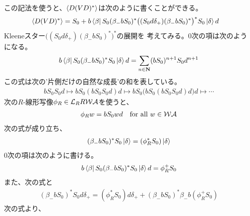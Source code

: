{	この記法を使うと、$\mathinner{\langle{D(VD)^*}\rangle}$は次のように書くことができる。
	\begin{equation*}\begin{split}
		\mathinner{\langle{D(VD)^*}\rangle} &= S_0 + b\mathinner{\langle{\beta}|}S_0(\beta_-bS_0)^*
		\bigl((S_0d\delta_+)(\beta_-bS_0)^*\bigr)^*S_0\mathinner{|{\delta}\rangle}d
	\end{split}\end{equation*}
	Kleeneスター$\bigl((S_0d\delta_+)(\beta_-bS_0)^*\bigr)^*$の展開を
	考えてみる。$0$次の項は次のようになる。
	\begin{equation*}\begin{split}
		b\mathinner{\langle{\beta}|}S_0(\beta_-bS_0)^*S_0\mathinner{|{\delta}\rangle}d
		= \sum_{n\in\mathbf{N}}(bS_0)^{n+1}S_0d^{n+1}
	\end{split}\end{equation*}
	この式は次の'片側だけの自然な成長'の和を表している。
	\begin{equation*}\begin{split}
		bS_0S_0d \mapsto bS_0(bS_0S_0d)d
		\mapsto bS_0\bigl(bS_0(bS_0S_0d)d\bigr)d
		\mapsto \cdots
	\end{split}\end{equation*}
	次の$R$-線形写像$\phi_R\in\mathcal{L}_RR{{\mathcal{W}}}{{\mathcal{A}}}$を使うと、
	\begin{equation*}\begin{split}
		\phi_Rw &= bS_0wd \quad\text{for all } w\in {\ensuremath{{\mathcal{W}}}}{\ensuremath{{\mathcal{A}}}} \\
	\end{split}\end{equation*}
	次の式が成り立ち、
	\begin{equation*}\begin{split}
		(\beta_-bS_0)^*S_0\mathinner{|{\delta}\rangle} &= (\phi_R^*S_0)\mathinner{|{\delta}\rangle} \\
	\end{split}\end{equation*}
	$0$次の項は次のように書ける。
	\begin{equation*}\begin{split}
		b\mathinner{\langle{\beta}|}S_0(\beta_-bS_0)^*S_0\mathinner{|{\delta}\rangle}d = \phi_R^+S_0
	\end{split}\end{equation*}
	また、次の式と
	\begin{equation*}\begin{split}
		(\beta_-bS_0)^*S_0d\delta_+
		= (\phi_R^*S_0)d\delta_+ + (\beta_-bS_0)^*\beta_-b(\phi_R^+S_0)
	\end{split}\end{equation*}
	次の式より、
	\begin{equation*}\begin{split}

\end{split}
\end{equation*}}

